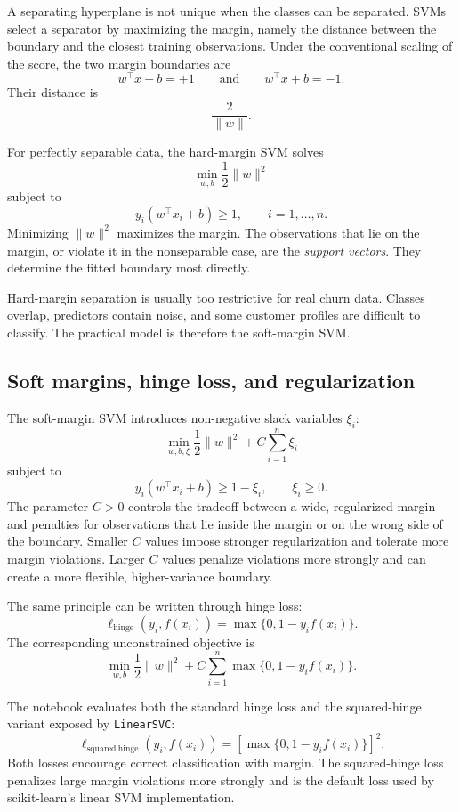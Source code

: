 A separating hyperplane is not unique when the classes can be separated. SVMs select a separator by maximizing the margin, namely the distance between the boundary and the closest training observations. Under the conventional scaling of the score, the two margin boundaries are
\[
w^\top x + b = +1
\qquad \text{and} \qquad
w^\top x + b = -1.
\]
Their distance is
\[
\frac{2}{\lVert w \rVert}.
\]

For perfectly separable data, the hard-margin SVM solves
\[
\min_{w,b} \frac{1}{2}\lVert w \rVert^2
\]
subject to
\[
y_i(w^\top x_i+b)\geq 1,
\qquad i=1,\ldots,n.
\]
Minimizing \(\lVert w\rVert^2\) maximizes the margin. The observations that lie on the margin, or violate it in the nonseparable case, are the \emph{support vectors}. They determine the fitted boundary most directly.

Hard-margin separation is usually too restrictive for real churn data. Classes overlap, predictors contain noise, and some customer profiles are difficult to classify. The practical model is therefore the soft-margin SVM.

\subsection{Soft margins, hinge loss, and regularization}

The soft-margin SVM introduces non-negative slack variables \(\xi_i\):
\[
\min_{w,b,\xi}
\frac{1}{2}\lVert w\rVert^2
+
C\sum_{i=1}^{n}\xi_i
\]
subject to
\[
y_i(w^\top x_i+b)\geq 1-\xi_i,
\qquad
\xi_i\geq 0.
\]
The parameter \(C>0\) controls the tradeoff between a wide, regularized margin and penalties for observations that lie inside the margin or on the wrong side of the boundary. Smaller \(C\) values impose stronger regularization and tolerate more margin violations. Larger \(C\) values penalize violations more strongly and can create a more flexible, higher-variance boundary.

The same principle can be written through hinge loss:
\[
\ell_{\mathrm{hinge}}(y_i,f(x_i))
=
\max\{0,1-y_i f(x_i)\}.
\]
The corresponding unconstrained objective is
\[
\min_{w,b}
\frac{1}{2}\lVert w\rVert^2
+
C\sum_{i=1}^{n}
\max\{0,1-y_i f(x_i)\}.
\]

The notebook evaluates both the standard hinge loss and the squared-hinge variant exposed by \texttt{LinearSVC}:
\[
\ell_{\mathrm{squared\ hinge}}(y_i,f(x_i))
=
\left[
\max\{0,1-y_i f(x_i)\}
\right]^2.
\]
Both losses encourage correct classification with margin. The squared-hinge loss penalizes large margin violations more strongly and is the default loss used by scikit-learn's linear SVM implementation.

